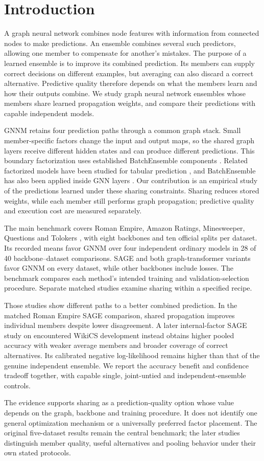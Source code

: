 \section{Introduction}
A graph neural network combines node features with information from connected nodes to make predictions. An ensemble combines several such predictors, allowing one member to compensate for another's mistakes. The purpose of a learned ensemble is to improve its combined prediction. Its members can supply correct decisions on different examples, but averaging can also discard a correct alternative. Predictive quality therefore depends on what the members learn and how their outputs combine. We study graph neural network ensembles whose members share learned propagation weights, and compare their predictions with capable independent models.

GNNM retains four prediction paths through a common graph stack. Small member-specific factors change the input and output maps, so the shared graph layers receive different hidden states and can produce different predictions. This boundary factorization uses established BatchEnsemble components \citep{wen2020batchensemble}. Related factorized models have been studied for tabular prediction \citep{gorishniy2025tabm}, and BatchEnsemble has also been applied inside GNN layers \citep{kim2023efficient}. Our contribution is an empirical study of the predictions learned under these sharing constraints. Sharing reduces stored weights, while each member still performs graph propagation; predictive quality and execution cost are measured separately.

The main benchmark covers Roman Empire, Amazon Ratings, Minesweeper, Questions and Tolokers \citep{platonov2023critical}, with eight backbones and ten official splits per dataset. Its recorded means favor GNNM over four independent ordinary models in 28 of 40 backbone--dataset comparisons. SAGE and both graph-transformer variants favor GNNM on every dataset, while other backbones include losses. The benchmark compares each method's intended training and validation-selection procedure. Separate matched studies examine sharing within a specified recipe.

Those studies show different paths to a better combined prediction. In the matched Roman Empire SAGE comparison, shared propagation improves individual members despite lower disagreement. A later internal-factor SAGE study on encountered WikiCS development instead obtains higher pooled accuracy with weaker average members and broader coverage of correct alternatives. Its calibrated negative log-likelihood remains higher than that of the genuine independent ensemble. We report the accuracy benefit and confidence tradeoff together, with capable single, joint-untied and independent-ensemble controls.

The evidence supports sharing as a prediction-quality option whose value depends on the graph, backbone and training procedure. It does not identify one general optimization mechanism or a universally preferred factor placement. The original five-dataset results remain the central benchmark; the later studies distinguish member quality, useful alternatives and pooling behavior under their own stated protocols.

